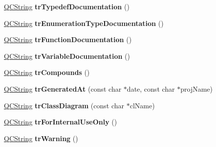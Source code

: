\begin{DoxyCompactItemize}
\item 
\hypertarget{class_translator_croatian_a1611eb91129bc7fbac2586a1b913710d}{\hyperlink{class_q_c_string}{Q\-C\-String} {\bfseries tr\-Typedef\-Documentation} ()}\label{class_translator_croatian_a1611eb91129bc7fbac2586a1b913710d}

\item 
\hypertarget{class_translator_croatian_ae11f24a699bb6c1becaf521cdac12ab0}{\hyperlink{class_q_c_string}{Q\-C\-String} {\bfseries tr\-Enumeration\-Type\-Documentation} ()}\label{class_translator_croatian_ae11f24a699bb6c1becaf521cdac12ab0}

\item 
\hypertarget{class_translator_croatian_a54c0fb7e39b052558da3844673b26e1e}{\hyperlink{class_q_c_string}{Q\-C\-String} {\bfseries tr\-Function\-Documentation} ()}\label{class_translator_croatian_a54c0fb7e39b052558da3844673b26e1e}

\item 
\hypertarget{class_translator_croatian_aeff3c7fbc21cb023b224c101b81210ed}{\hyperlink{class_q_c_string}{Q\-C\-String} {\bfseries tr\-Variable\-Documentation} ()}\label{class_translator_croatian_aeff3c7fbc21cb023b224c101b81210ed}

\item 
\hypertarget{class_translator_croatian_ae2c887f8a9fe5663d722b798b02628e8}{\hyperlink{class_q_c_string}{Q\-C\-String} {\bfseries tr\-Compounds} ()}\label{class_translator_croatian_ae2c887f8a9fe5663d722b798b02628e8}

\item 
\hypertarget{class_translator_croatian_a6675fccca4756f9c0d86797009a4ad7e}{\hyperlink{class_q_c_string}{Q\-C\-String} {\bfseries tr\-Generated\-At} (const char $\ast$date, const char $\ast$proj\-Name)}\label{class_translator_croatian_a6675fccca4756f9c0d86797009a4ad7e}

\item 
\hypertarget{class_translator_croatian_a5dc8187057a8e4f4ca85ad94ade9e82c}{\hyperlink{class_q_c_string}{Q\-C\-String} {\bfseries tr\-Class\-Diagram} (const char $\ast$cl\-Name)}\label{class_translator_croatian_a5dc8187057a8e4f4ca85ad94ade9e82c}

\item 
\hypertarget{class_translator_croatian_ac4cc9aa408e288c1e2b037ec3b23c4f7}{\hyperlink{class_q_c_string}{Q\-C\-String} {\bfseries tr\-For\-Internal\-Use\-Only} ()}\label{class_translator_croatian_ac4cc9aa408e288c1e2b037ec3b23c4f7}

\item 
\hypertarget{class_translator_croatian_aae1caf252b911312ae9c13e4f478cea3}{\hyperlink{class_q_c_string}{Q\-C\-String} {\bfseries tr\-Warning} ()}\label{class_translator_croatian_aae1caf252b911312ae9c13e4f478cea3}


\end{DoxyCompactItemize}
